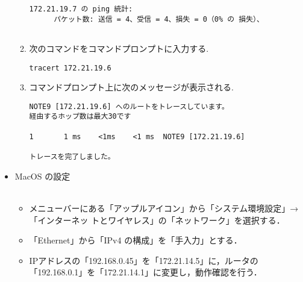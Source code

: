 \documentclass[a4j,titlepage]{jarticle}
\begin{document}
\begin{itemize}
\begin{enumerate}
\begin{center}
\begin{screen}
\begin{verbatim}
172.21.19.7 の ping 統計:
    　パケット数: 送信 = 4、受信 = 4、損失 = 0（0% の 損失）、
    
\end{verbatim}
    \end{screen}
  \end{center}
  
  \item 次のコマンドをコマンドプロンプトに入力する.
  \begin{center}
    \begin{screen}
\begin{verbatim}
tracert 172.21.19.6
\end{verbatim}
    \end{screen}
  \end{center}
\item コマンドプロンプト上に次のメッセージが表示される.\\
    \begin{center}
    \begin{screen}
\begin{verbatim}
NOTE9 [172.21.19.6] へのルートをトレースしています。
経由するホップ数は最大30です

1       1 ms    <1ms    <1 ms  NOTE9 [172.21.19.6]

トレースを完了しました。
\end{verbatim}
    \end{screen}
  \end{center}

\end{enumerate}


  
\item MacOS の設定\\
　\begin{itemize}
\item メニューバーにある「アップルアイコン」から「システム環境設定」→「インターネッ トとワイヤレス」の「ネットワーク」を選択する．\\
\item 「Ethernet」から「IPv4 の構成」を「手入力」とする．\\

\item IPアドレスの「192.168.0.45」を「172.21.14.5」に，ルータの「192.168.0.1」を「172.21.14.1」に変更し，動作確認を行う．\\

\end{itemize}
\end{itemize}
\end{document}
